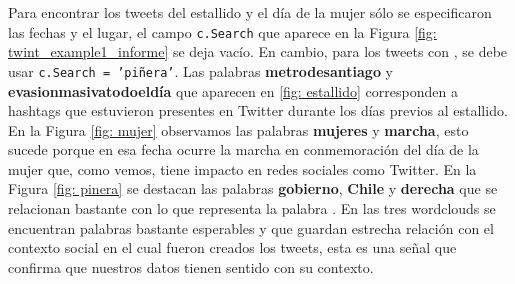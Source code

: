 \documentclass{article}
\begin{document}
   Para encontrar los tweets del estallido y el día de la mujer sólo se especificaron las fechas y el lugar, el campo \texttt{c.Search} que aparece en la Figura \ref{fig: twint_example1_informe} se deja vacío. En cambio, para los tweets con , se debe usar \texttt{c.Search = 'piñera'}. Las palabras \textbf{metrodesantiago} y \textbf{evasionmasivatodoeldía} que aparecen en \ref{fig: estallido} corresponden a hashtags que estuvieron presentes en Twitter durante los días previos al estallido. En la Figura \ref{fig: mujer} observamos las palabras \textbf{mujeres} y \textbf{marcha}, esto sucede porque en esa fecha ocurre la marcha en conmemoración del día de la mujer que, como vemos, tiene impacto en redes sociales como Twitter. En la Figura \ref{fig: pinera} se destacan las palabras \textbf{gobierno}, \textbf{Chile} y \textbf{derecha} que se relacionan bastante con lo que representa la palabra . En las tres wordclouds se encuentran palabras bastante esperables y que guardan estrecha relación con el contexto social en el cual fueron creados los tweets, esta es una señal que confirma que nuestros datos tienen sentido con su contexto.
    
\end{document}
